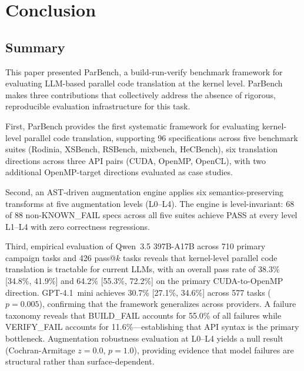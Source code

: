 \documentclass[conference]{IEEEtran}
\newcommand{\buildfail}{\textsc{BUILD\_FAIL}}
\newcommand{\verifyfail}{\textsc{VERIFY\_FAIL}}
\begin{document}
\section{Conclusion}
\label{sec:conclusion}

\subsection{Summary}

This paper presented ParBench, a build-run-verify benchmark framework for evaluating LLM-based parallel code translation at the kernel level. ParBench makes three contributions that collectively address the absence of rigorous, reproducible evaluation infrastructure for this task.

First, ParBench provides the first systematic framework for evaluating kernel-level parallel code translation, supporting 96 specifications across five benchmark suites (Rodinia, XSBench, RSBench, mixbench, HeCBench), six translation directions across three API pairs (CUDA, OpenMP, OpenCL), with two additional OpenMP-target directions evaluated as case studies.

Second, an AST-driven augmentation engine applies six semantics-preserving transforms at five augmentation levels (L0--L4). The engine is level-invariant: 68 of 88 non-KNOWN\_FAIL specs across all five suites achieve PASS at every level L1--L4 with zero correctness regressions.

Third, empirical evaluation of Qwen~3.5 397B-A17B across 710 primary campaign tasks and 426 pass@$k$ tasks reveals that kernel-level parallel code translation is tractable for current LLMs, with an overall pass rate of 38.3\% [34.8\%, 41.9\%] and 64.2\% [55.3\%, 72.2\%] on the primary CUDA-to-OpenMP direction. GPT-4.1~mini achieves 30.7\% [27.1\%, 34.6\%] across 577 tasks ($p = 0.005$), confirming that the framework generalizes across providers. %
A failure taxonomy reveals that \buildfail{} accounts for 55.0\% of all failures while \verifyfail{}{} accounts for 11.6\%---establishing that API syntax is the primary bottleneck. Augmentation robustness evaluation at L0--L4 yields a null result (Cochran-Armitage $z = 0.0$, $p = 1.0$), providing evidence that model failures are structural rather than surface-dependent.
\end{document}
